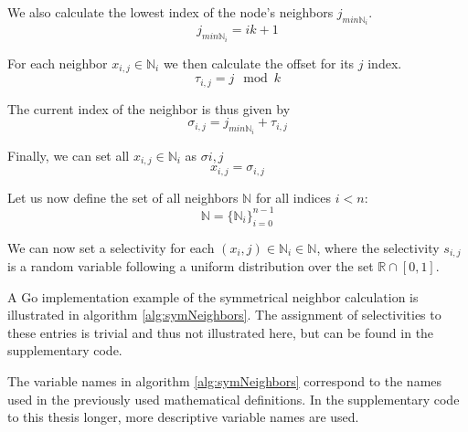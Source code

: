 We also calculate the lowest index of the node's neighbors $j_{min\mathbb{N}_i}$.
\begin{equation}
    j_{min\mathbb{N}_i} = ik + 1
\end{equation}

For each neighbor $x_{i, j} \in \mathbb{N}_i$ we then calculate the offset for its $j$ index.
\begin{equation}
    \tau_{i,j} = j\mod{k}
\end{equation}

The current index of the neighbor is thus given by
\begin{equation}
    \sigma_{i,j} = j_{min\mathbb{N}_i} + \tau_{i,j}
\end{equation}

Finally, we can set all $x_{i, j} \in \mathbb{N}_i$ as $\sigma{i,j}$
\begin{equation}
    x_{i, j} = \sigma_{i,j}
\end{equation}

Let us now define the set of all neighbors $\mathbb{N}$ for all indices $i < n$:
\begin{equation}
    \mathbb{N} = \{\mathbb{N}_i\}_{i=0}^{n-1}
\end{equation}

We can now set a selectivity for each $(x_i,j) \in \mathbb{N}_i \in \mathbb{N}$, where the selectivity $s_{i,j}$ is a random variable following a uniform distribution over the set $\mathbb{R} \cap [0,1]$.

A Go implementation example of the symmetrical neighbor calculation is illustrated in algorithm \ref{alg:symNeighbors}. The assignment of selectivities to these entries is trivial and thus not illustrated here, but can be found in the supplementary code.

\begin{note}
The variable names in algorithm \ref{alg:symNeighbors} correspond to the names used in the previously used mathematical definitions. In the supplementary code to this thesis longer, more descriptive variable names are used.
\end{note}


